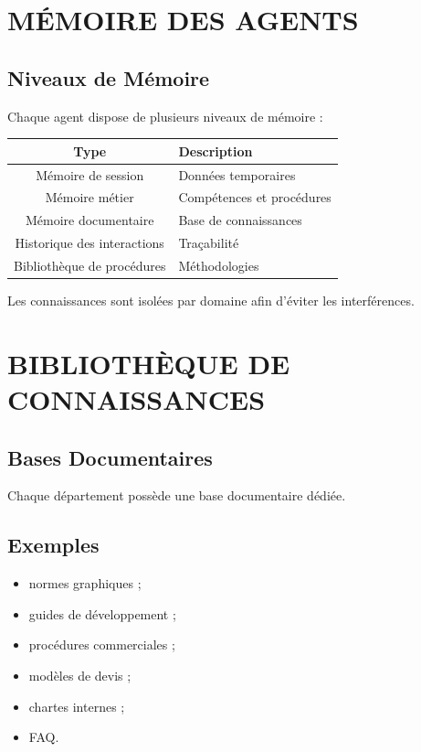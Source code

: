 \documentclass[12pt,a4paper,oneside]{book}
\begin{document}
\chapter{MÉMOIRE DES AGENTS}

\section{Niveaux de Mémoire}
Chaque agent dispose de plusieurs niveaux de mémoire :
\begin{center}
\begin{tabular}{|c|p{10cm}|}
\hline
\rowcolor{electroncyan}
\color{white}\textbf{Type} & \color{white}\textbf{Description} \\
\hline
Mémoire de session & Données temporaires \\
\hline
Mémoire métier & Compétences et procédures \\
\hline
Mémoire documentaire & Base de connaissances \\
\hline
Historique des interactions & Traçabilité \\
\hline
Bibliothèque de procédures & Méthodologies \\
\hline
\end{tabular}
\end{center}

Les connaissances sont isolées par domaine afin d'éviter les interférences.

\chapter{BIBLIOTHÈQUE DE CONNAISSANCES}

\section{Bases Documentaires}
Chaque département possède une base documentaire dédiée.

\section{Exemples}
\begin{itemize}
\item normes graphiques ;
\item guides de développement ;
\item procédures commerciales ;
\item modèles de devis ;
\item chartes internes ;
\item FAQ.
\end{itemize}
\end{document}
